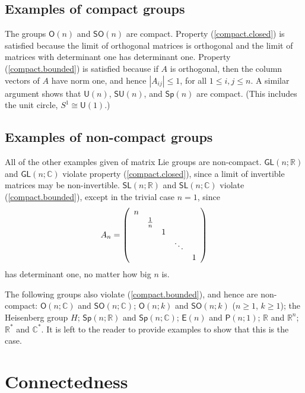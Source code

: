 \documentclass[12pt]{amsbook}
\theoremstyle{plain}
\numberwithin{equation}{chapter}
\numberwithin{theorem}{chapter}
\begin{document}
\subsection{Examples of compact groups}

The groups $\mathsf{O}(n)$ and $\mathsf{SO}(n)$ are compact. Property
(\ref{compact.closed}) is satisfied because the limit of orthogonal matrices
is orthogonal and the limit of matrices with determinant one has determinant
one. Property (\ref{compact.bounded}) is satisfied because if $A$ is
orthogonal, then the column vectors of $A$ have norm one, and hence $\left|
A_{ij}\right|  \leq1$, for all $1\leq i,j\leq n$. A similar argument shows
that $\mathsf{U}(n)$, $\mathsf{SU}(n)$, and $\mathsf{Sp}(n)$ are compact.
(This includes the unit circle, $S^{1}\cong\mathsf{U}(1)$.)

\subsection{Examples of non-compact groups}

All of the other examples given of matrix Lie groups are non-compact.
$\mathsf{GL}(n;\mathbb{R})$ and $\mathsf{GL}(n;\mathbb{C})$ violate property
(\ref{compact.closed}), since a limit of invertible matrices may be
non-invertible. $\mathsf{SL}\left(  n;\mathbb{R}\right)  $ and $\mathsf{SL}%
\left(  n;\mathbb{C}\right)  $ violate (\ref{compact.bounded}), except in the
trivial case $n=1$, since
\[
A_{n}=\left(
\begin{array}
[c]{ccccc}%
n &  &  &  & \\
& \frac1n &  &  & \\
&  & 1 &  & \\
&  &  & \ddots & \\
&  &  &  & 1
\end{array}
\right)
\]
has determinant one, no matter how big $n$ is.

The following groups also violate (\ref{compact.bounded}), and hence are
non-compact: $\mathsf{O}(n;\mathbb{C})$ and $\mathsf{SO}(n;\mathbb{C})$;
$\mathsf{O}(n;k)$ and $\mathsf{SO}(n;k)$ ($n\geq1$, $k\geq1$); the Heisenberg
group $H$; $\mathsf{Sp}\left(  n;\mathbb{R}\right)  $ and $\mathsf{Sp}\left(
n;\mathbb{C}\right)  $; $\mathsf{E}(n)$ and $\mathsf{P}(n;1)$; $\mathbb{R}$
and $\mathbb{R}^{n}$; $\mathbb{R}^{*}$ and $\mathbb{C}^{*}$. It is left to the
reader to provide examples to show that this is the case.

\section{Connectedness}
\end{document}

